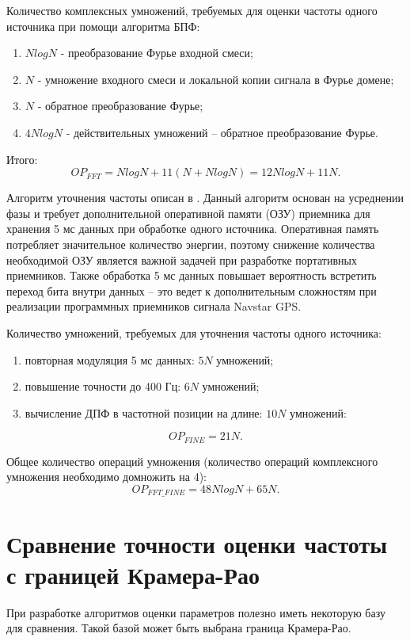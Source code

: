 Количество комплексных умножений, требуемых для оценки частоты одного источника при помощи алгоритма БПФ:
\begin{enumerate}
\item ${NlogN}$ - преобразование Фурье входной смеси;
\item ${N}$ - умножение входного смеси и локальной копии сигнала в Фурье домене;
\item ${N}$ - обратное преобразование Фурье;
\item ${4NlogN}$ - действительных умножений – обратное преобразование Фурье. 
\end{enumerate}

Итого:
\begin{equation}
	\label{eq:op_fft}
	OP_{FFT} = NlogN + 11(N + NlogN) = 12NlogN + 11N.
\end{equation}

Алгоритм уточнения частоты описан в \cite{tsui}. Данный алгоритм основан на усреднении фазы и требует дополнительной оперативной памяти (ОЗУ) приемника для
хранения 5 мс данных при обработке одного источника. Оперативная память потребляет значительное количество энергии, поэтому снижение количества
необходимой ОЗУ является важной задачей при разработке портативных приемников. Также обработка 5 мс данных повышает вероятность встретить переход бита
внутри данных – это ведет к дополнительным сложностям при реализации программных приемников сигнала Navstar GPS.

Количество умножений, требуемых для уточнения частоты одного источника:
\begin{enumerate}
\item повторная модуляция 5 мс данных: ${5N}$ умножений;
\item повышение точности до 400 Гц: ${6N}$ умножений;
\item вычисление ДПФ в частотной позиции на длине: ${10N}$ умножений:
\end{enumerate}
\begin{equation}
	\label{eq:op_fine}
	OP_{FINE} = 21N.
\end{equation}

Общее количество операций умножения (количество операций комплексного умножения необходимо домножить на 4):
\begin{equation}
	\label{eq:op_fine_fft}
	OP_{FFT\_FINE} = 48NlogN + 65N.
\end{equation}

\section{Сравнение точности оценки частоты с границей Крамера-Рао}
При разработке алгоритмов оценки параметров полезно иметь некоторую базу для сравнения. Такой базой может быть выбрана граница Крамера-Рао.

